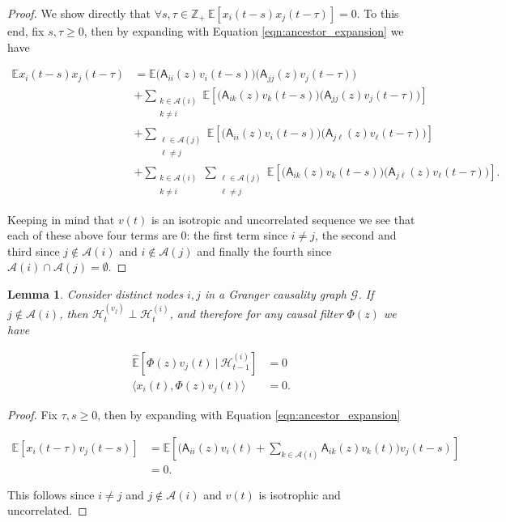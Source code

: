 \documentclass{statsoc}
\newcounter{lemma}
\def\gcg{\mathcal{G}}  %
\def\A{\mathsf{A}}  %
\def\H{\mathcal{H}}  %
\newcommand{\linE}[2]{\hat{\E}[#1\ |\ #2]}  %
\newcommand{\anc}[1]{\mathcal{A}(#1)}  %
\newtheorem{lemma}{Lemma}
\def\H{\mathcal{H}}  %
\def\E{\mathbb{E}}  %
\def\Z{\mathbb{Z}}  %
\newcommand{\inner}[2]{\langle #1, #2 \rangle}  %
\begin{document}
\begin{proof}
  We show directly that
  $\forall s, \tau \in \Z_+\ \E[x_i(t - s)x_j(t - \tau)] = 0$.  To this end, fix
  $s, \tau \ge 0$, then by expanding with Equation
  \eqref{eqn:ancestor_expansion} we have

  \begin{align*}
    \E x_i(t - s)x_j(t - \tau)
    &= \E \big(\A_{ii}(z)v_i(t - s)\big)\big(\A_{jj}(z)v_j(t - \tau)\big)\\
    &+ \sum_{\substack{k \in \anc{i} \\ k \ne i}}\E[\big(\A_{ik}(z)v_k(t - s)\big)\big(\A_{jj}(z)v_j(t - \tau)\big)]\\
    &+ \sum_{\substack{\ell \in \anc{j} \\ \ell \ne j}}\E[\big(\A_{ii}(z)v_i(t - s)\big) \big(\A_{j\ell}(z) v_\ell(t - \tau)\big)]\\
    &+ \sum_{\substack{k \in \anc{i} \\ k \ne i}}\sum_{\substack{\ell \in \anc{j} \\ \ell \ne j}}\E[\big(\A_{ik}(z)v_k(t - s)\big)\big(\A_{j\ell}(z)v_\ell(t - \tau)\big)].
  \end{align*}
  
  Keeping in mind that $v(t)$ is an isotropic and uncorrelated
  sequence we see that each of these above four terms are 0: the
  first term since $i \ne j$, the second and third since
  $j \not\in \anc{i}$ and $i \not\in \anc{j}$ and finally the fourth since
  $\anc{i} \cap \anc{j} = \emptyset$.
\end{proof}

\begin{lemma}
  \label{lem:vj_perp}
  Consider distinct nodes $i, j$ in a Granger causality graph $\gcg$.
  If $j \not \in \anc{i}$, then $\H_t^{(v_j)} \perp \H_{t}^{(i)}$, and therefore
  for any causal filter $\Phi(z)$ we have

  \begin{align*}
    \linE{\Phi(z)v_j(t)}{\H_{t - 1}^{(i)}} &= 0\\
    \inner{x_i(t)}{\Phi(z)v_j(t)} & = 0.
  \end{align*}
\end{lemma}
\begin{proof}
  Fix $\tau, s \ge 0$, then by expanding with Equation \eqref{eqn:ancestor_expansion}

  \begin{align*}
    \E[x_i(t - \tau)v_j(t - s)] &= \E[\big(\A_{ii}(z)v_i(t) + \sum_{k \in \anc{i}}\A_{ik}(z)v_k(t) \big) v_j(t - s)]\\
    &= 0.
  \end{align*}

  This follows since $i \ne j$ and $j \not \in \anc{i}$ and $v(t)$ is
  isotrophic and uncorrelated.
\end{proof}
\end{document}
